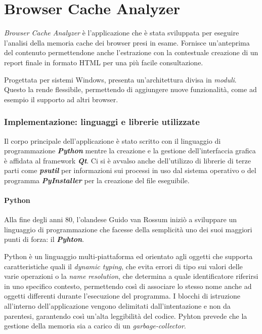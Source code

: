 \chapter{Browser Cache Analyzer}

\textit{Browser Cache Analyzer} è l'applicazione che è stata sviluppata per eseguire l'analisi della memoria cache dei browser presi in esame. Fornisce un'anteprima del contenuto permettendone anche l'estrazione con la contestuale creazione di un report finale in formato HTML per una più facile consultazione.

Progettata per sistemi Windows, presenta un'architettura divisa in \textit{moduli}. Questo la rende flessibile, permettendo di aggiungere nuove funzionalità, come ad esempio il supporto ad altri browser.

\subsection{Implementazione: linguaggi e librerie utilizzate}
Il corpo principale dell'applicazione è stato scritto con il linguaggio di programmazione \textbf{\textit{Python}} mentre la creazione e la gestione dell'interfaccia grafica è affidata al framework \textbf{\textit{Qt}}. Ci si è avvalso anche dell'utilizzo di librerie di terze parti come \textbf{\textit{psutil}} per informazioni sui processi in uso dal sistema operativo o del programma \textbf{\textit{PyInstaller}} per la creazione del file eseguibile.

\subsubsection{Python}
\nocite{Python}
Alla fine degli anni 80, l'olandese Guido van Rossum iniziò a sviluppare un linguaggio di programmazione che facesse della semplicità uno dei suoi maggiori punti di forza: il \textbf{\textit{Pyhton}}. 

Python è un linguaggio multi-piattaforma ed orientato agli oggetti che supporta caratteristiche quali il \textit{dynamic typing}, che evita errori di tipo sui valori delle varie operazioni o la \textit{name resolution}, che determina a quale identificatore riferirsi in uno specifico contesto, permettendo così di associare lo stesso nome anche ad oggetti differenti durante l'esecuzione del programma. I blocchi di istruzione all'interno dell'applicazione vengono delimitati dall'intentazione e non da parentesi, garantendo così un'alta leggibilità del codice. Pyhton prevede che la gestione della memoria sia a carico di un \textit{garbage-collector}.

